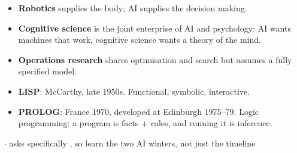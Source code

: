 {\begin{itemize}
  \item \textbf{Robotics} supplies the body; AI supplies the decision making.
  \item \textbf{Cognitive science} is the joint enterprise of AI and psychology: AI wants
        machines that work, cognitive science wants a theory of the mind.
  \item \textbf{Operations research} shares optimisation and search but assumes a fully
        specified model.
\end{itemize}
\begin{itemize}
  \item \textbf{LISP}: McCarthy, late 1950s. Functional, symbolic, interactive.
  \item \textbf{PROLOG}: France 1970, developed at Edinburgh 1975--79. Logic programming:
        a program is facts $+$ rules, and running it is inference. 
\end{itemize}}


{\color{sub}\footnotesize {}  \gap$\cdot$\gap
{} asks specifically , so learn the two AI winters, not just the timeline}

